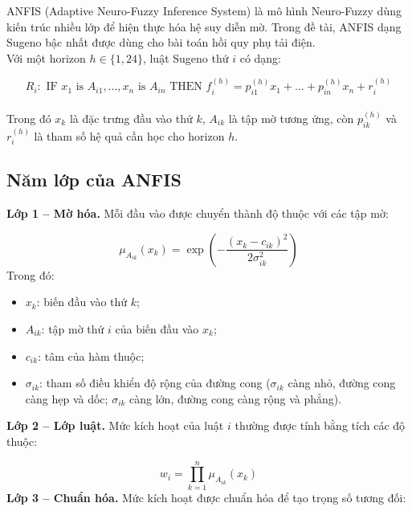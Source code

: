 ANFIS (Adaptive Neuro-Fuzzy Inference System) là mô hình Neuro-Fuzzy dùng kiến trúc nhiều lớp để hiện thực hóa hệ suy diễn mờ. Trong đề tài, ANFIS dạng Sugeno bậc nhất được dùng cho bài toán hồi quy phụ tải điện.
\\
Với một horizon $h \in \{1, 24\}$, luật Sugeno thứ $i$ có dạng:

\begin{equation}
  R_i: \text{ IF } x_1 \text{ is } A_{i1}, \ldots, x_n \text{ is } A_{in}
  \text{ THEN } f_i^{(h)} = p_{i1}^{(h)}x_1 + \ldots + p_{in}^{(h)}x_n + r_i^{(h)}
\end{equation}
\\
Trong đó $x_k$ là đặc trưng đầu vào thứ $k$, $A_{ik}$ là tập mờ tương ứng, còn $p_{ik}^{(h)}$ và $r_i^{(h)}$ là tham số hệ quả cần học cho horizon $h$.

\subsection{Năm lớp của ANFIS}

\textbf{Lớp 1 -- Mờ hóa.} Mỗi đầu vào được chuyển thành độ thuộc với các tập mờ:

\begin{equation}
  \mu_{A_{ik}}(x_k) = \exp\left(-\frac{(x_k - c_{ik})^2}{2\sigma_{ik}^2}\right)
\end{equation}
Trong đó:
\begin{itemize}[leftmargin=1.2cm]
  \item $x_k$: biến đầu vào thứ $k$;
  \item $A_{ik}$: tập mờ thứ $i$ của biến đầu vào $x_k$;
  \item $c_{ik}$: tâm của hàm thuộc;
  \item $\sigma_{ik}$: tham số điều khiển độ rộng của đường cong ($\sigma_{ik}$ càng nhỏ, đường cong càng hẹp và dốc; $\sigma_{ik}$ càng lớn, đường cong càng rộng và phẳng).
\end{itemize}
\textbf{Lớp 2 -- Lớp luật.} Mức kích hoạt của luật $i$ thường được tính bằng tích các độ thuộc:

\begin{equation}
  w_i = \prod_{k=1}^{n}\mu_{A_{ik}}(x_k)
\end{equation}
\textbf{Lớp 3 -- Chuẩn hóa.} Mức kích hoạt được chuẩn hóa để tạo trọng số tương đối:


